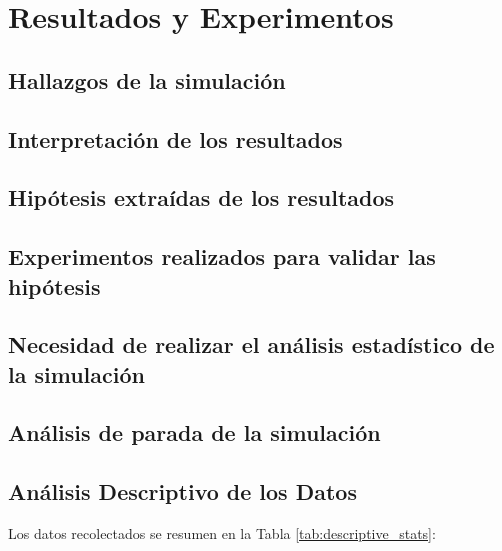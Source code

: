 \documentclass[10pt,twocolumn]{article}
\begin{document}
	\section{Resultados y Experimentos}
	\subsection{Hallazgos de la simulación}
	\subsection{Interpretación de los resultados}
	\subsection{Hipótesis extraídas de los resultados}
	\subsection{Experimentos realizados para validar las hipótesis}
	\subsection{Necesidad de realizar el análisis estadístico de la simulación}
	\subsection{Análisis de parada de la simulación}
	
	\subsection{Análisis Descriptivo de los Datos}
	Los datos recolectados se resumen en la Tabla \ref{tab:descriptive_stats}:
	
\end{document}
